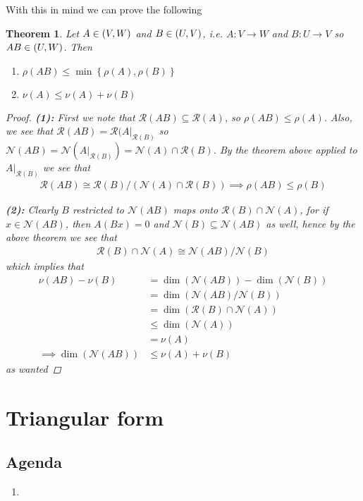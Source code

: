 \documentclass[10pt,twoside,openany,final]{memoir}
\theoremstyle{break}
\newtheorem{theorem}[section]{Theorem}
\theoremstyle{Break}
\let\Hom\relax
\DeclareMathOperator{\Hom}{Hom}
\newcommand{\Rg}{\mathcal{R}}
\newcommand{\Nl}{\mathcal{N}}
\begin{document}
With this in mind we can prove the following
\begin{theorem}
Let $A \in \Hom(V,W)$ and $B \in \Hom(U,V)$, i.e. $A \colon V \to W$ and $B \colon U \to V$ so $AB \in \Hom(U,W)$. Then
\begin{enumerate}
	\item $\rho(AB) \leq \min\left\{ \rho(A),\rho(B) \right\}$
	\item $\nu(A) \leq \nu(A) + \nu(B)$
\end{enumerate}
\begin{proof}
	\textbf{(1):} First we note that $\Rg(AB) \subseteq \Rg(A)$, so $\rho\left( AB \right) \leq \rho(A)$. Also, we see that $\Rg(AB)=\Rg(A\big|_{\Rg(B)}$ so $\Nl(AB)=\Nl(A\big|_{\Rg(B)})=\Nl(A) \cap \Rg(B)$. By the theorem above applied to $A\big| _{\Rg(B)}$ we see that
	\begin{align*}
		\Rg(AB) \cong \Rg(B)/(\Nl(A) \cap \Rg(B)) \implies \rho(AB) \leq \rho(B)
	\end{align*}

	\textbf{(2):} Clearly $B$ restricted to $\Nl(AB)$ maps onto $\Rg(B) \cap \Nl(A)$, for if $x \in \Nl(AB)$, then $A(Bx)=0$ and $\Nl(B) \subseteq \Nl(AB)$ as well, hence by the above theorem we see that
	\begin{align*}
		\Rg(B) \cap \Nl(A) \cong \Nl(AB) / \Nl(B)
	\end{align*}
	which implies that 
\begin{align*}
	\nu(AB)-\nu(B)&=\dim(\Nl(AB))-\dim(\Nl(B))\\
	&=\dim(\Nl(AB) / \Nl(B))\\
	&=\dim(\Rg(B) \cap \Nl(A))\\
	&\leq \dim(\Nl(A))\\
	&=\nu(A)\\ 
	\implies \dim(\Nl(AB))&\leq \nu(A) + \nu(B)
\end{align*}
as wanted
\end{proof}
\end{theorem}

\chapter{Triangular form}
\section*{Agenda}
\begin{enumerate}
	\item 
\end{enumerate}
\end{document}
